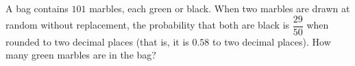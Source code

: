 A bag contains $101$ marbles, each green or black. When two marbles are drawn at random without replacement, the probability that both are black is $\dfrac{29}{50}$ when rounded to two decimal places (that is, it is $0.58$ to two decimal places). How many green marbles are in the bag?
